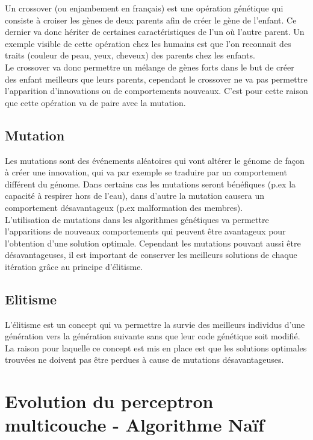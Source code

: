 \documentclass{article}
\begin{document}
Un crossover (ou enjambement en français) est une opération génétique qui consiste à croiser les gènes de deux parents afin de créer le gène de l'enfant. Ce dernier va donc hériter de certaines caractéristiques de l'un où l'autre parent. Un exemple visible de cette opération chez les humains est que l'on reconnait des traits (couleur de peau, yeux, cheveux) des parents chez les enfants\cite{wikicrossover}.\\

Le crossover va donc permettre un mélange de gènes forts dans le but de créer des enfant meilleurs que leurs parents, cependant le crossover ne va pas permettre l'apparition d'innovations ou de comportements nouveaux. C'est pour cette raison que cette opération va de paire avec la mutation.

\subsection{Mutation}

Les mutations sont des événements aléatoires qui vont altérer le génome de façon à créer une innovation, qui va par exemple se traduire par un comportement différent du génome. Dans certains cas les mutations seront bénéfiques (p.ex la capacité à respirer hors de l'eau), dans d'autre la mutation causera un comportement désavantageux (p.ex malformation des membres)\cite{wikimutation}.\\

L'utilisation de mutations dans les algorithmes génétiques va permettre l'apparitions de nouveaux comportements qui peuvent être avantageux pour l'obtention d'une solution optimale. Cependant les mutations pouvant aussi être désavantageuses, il est important de conserver les meilleurs solutions de chaque itération grâce au principe d'élitisme.

\subsection{Elitisme}

L'élitisme est un concept qui va permettre la survie des meilleurs individus d'une génération vers la génération suivante sans que leur code génétique soit modifié\cite{elitism}.\\
La raison pour laquelle ce concept est mis en place est que les solutions optimales trouvées ne doivent pas être perdues à cause de mutations désavantageuses.

\newpage
\section{Evolution du perceptron multicouche - Algorithme Naïf}
\end{document}
